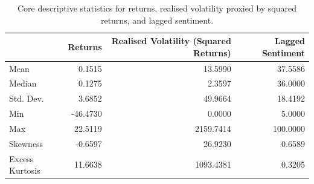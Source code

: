 \begin{table}
\caption{Core descriptive statistics for returns, realised volatility proxied by squared returns, and lagged sentiment.}
\label{tab:descriptive_stats}
\begin{tabular}{lrrr}
\toprule
 & Returns & Realised Volatility (Squared Returns) & Lagged Sentiment \\
\midrule
Mean & 0.1515 & 13.5990 & 37.5586 \\
Median & 0.1275 & 2.3597 & 36.0000 \\
Std. Dev. & 3.6852 & 49.9664 & 18.4192 \\
Min & -46.4730 & 0.0000 & 5.0000 \\
Max & 22.5119 & 2159.7414 & 100.0000 \\
Skewness & -0.6597 & 26.9230 & 0.6589 \\
Excess Kurtosis & 11.6638 & 1093.4381 & 0.3205 \\
\bottomrule
\end{tabular}
\end{table}

